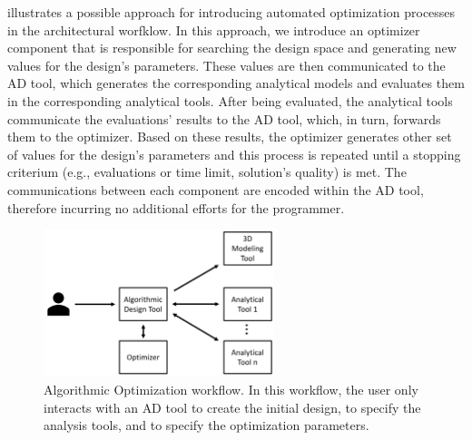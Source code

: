  illustrates a possible approach for introducing automated optimization processes in the architectural worfklow. In this approach, we introduce an optimizer component that is responsible for searching the design space and generating new values for the design's parameters. These values are then communicated to the \ac{AD} tool, which generates the corresponding analytical models and evaluates them in the corresponding analytical tools. After being evaluated, the analytical tools communicate the evaluations' results to the \ac{AD} tool, which, in turn, forwards them to the optimizer. Based on these results, the optimizer generates other set of values for the design's parameters and this process is repeated until a stopping criterium (e.g., evaluations or time limit, solution's quality) is met. The communications between each component are encoded within the \ac{AD} tool, therefore incurring no additional efforts for the programmer.
 
 \begin{figure}[htbp]
 	\centering
 	\includegraphics[width=0.6\textwidth]{./Images/Solution/algorithmic_optimization.png}
 	\caption{Algorithmic Optimization workflow. In this workflow, the user only interacts with an \ac{AD} tool to create the initial design, to specify the analysis tools, and to specify the optimization parameters.}
 	\label{fig:algorithmicoptimization}
 \end{figure}
 
